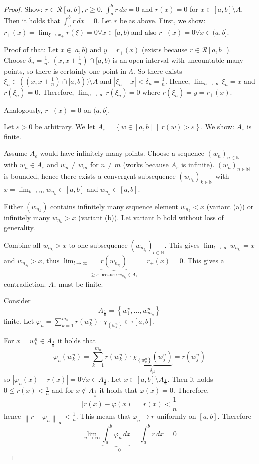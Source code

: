 \documentclass{article}
\newcommand{\set}[1]{\left\{#1\right\}}
\newcommand{\setdef}[2]{\left\{\left.#1\,\middle|\,#2\right.\right\}}
\newcommand{\norm}[1]{\left\|#1\right\|}
\newcommand{\card}[1]{\left|#1\right|}
\begin{document}
\begin{proof}
  Show: $r \in \mathcal R[a,b], r \geq 0$. $\int_a^b r \, dx = 0$
  and $r(x) = 0$ for $x \in [a,b] \setminus A$. Then it holds that $\int_a^b r \, dx = 0$.
  Let $r$ be as above. First, we show: $r_+(x) = \lim_{\xi\to x_+} r(\xi) = 0 \forall x \in [a,b)$
  and also $r_-(x) = 0 \forall x \in (a,b]$.

  Proof of that: Let $x \in [a,b)$ and $y = r_+(x)$ (exists because $r \in \mathcal R[a,b]$).
  Choose $\delta_n = \frac1n$. $(x, x + \frac1n) \cap [a,b)$ is an open interval with uncountable many points,
  so there is certainly one point in $A$. So there exists $\xi_n \in ((x, x + \frac1n) \cap [a,b)) \setminus A$
  and $\card{\xi_n - x} < \delta_n = \frac1n$.
  Hence, $\lim_{n\to\infty} \xi_n = x$ and $r(\xi_n) = 0$. Therefore, $\lim_{n\to\infty} r(\xi_n) = 0$ where $r(\xi_n) = y = r_+(x)$.

  Analogously, $r_-(x) = 0$ on $(a,b]$.

  Let $\varepsilon > 0$ be arbitrary. We let $A_{\varepsilon} = \setdef{w \in [a,b]}{r(w) > \varepsilon}$.
  We show: $A_{\varepsilon}$ is finite.

  Assume $A_{\varepsilon}$ would have infinitely many points. Choose a sequence $(w_n)_{n \in \mathbb N}$ with $w_n \in A_{\varepsilon}$ and $w_n \neq w_m$ for $n \neq m$ (works because $A_{\varepsilon}$ is infinite). $(w_n)_{n \in \mathbb N}$ is bounded, hence there exists a convergent subsequence $(w_{n_k})_{k \in \mathbb N}$ with $x = \lim_{k\to\infty} w_{n_k} \in [a,b]$ and $w_{n_k} \in [a,b]$.

  Either $(w_{n_k})$ contains infinitely many sequence element $w_{n_k} < x$ (variant (a)) or infinitely many $w_{n_k} > x$ (variant (b)). Let variant b hold without loss of generality.

  Combine all $w_{n_k} > x$ to one subsequence $(w_{n_{k_l}})_{l \in \mathbb N}$. This gives $\lim_{l\to\infty} w_{n_{k_l}} = x$ and $w_{n_{k_l}} > x$, thus $\lim_{l\to\infty} \underbrace{r(w_{n_{k_l}})}_{\geq \varepsilon \text{ because } w_{n_{k_l}} \in A_{\varepsilon}} = r_+(x) = 0$. This gives a contradiction. $A_{\varepsilon}$ must be finite.

  Consider
  \[ A_{\frac1n} = \set{w_1^n, \dots, w_{m_n}^n} \]
  finite. Let $\varphi_n = \sum_{k=1}^{m_n} r(w_k^n) \cdot \chi_{\set{w_k^n}} \in \tau[a,b]$.

  For $x = w^n_k \in A_{\frac1n}$ it holds that
  \[ \varphi_n(w_k^n) = \sum_{k=1}^{m_n} r(w_k^n) \cdot \underbrace{\chi_{\set{w_k^n}} (w_j^n)}_{\delta_{jk}} = r(w_j^n) \]
  so $\card{\varphi_n(x) - r(x)} = 0 \forall x \in A_{\frac1n}$.
  Let $x \in [a,b] \setminus A_{\frac1n}$. Then it holds $0 \leq r(x) < \frac1n$ and for $x \not\in A_{\frac1n}$ it holds that $\varphi(x) = 0$.
  Therefore,
  \[ \card{r(x) - \varphi(x)} = r(x) < \frac1n \]
  hence $\norm{r - \varphi_n}_{\infty} < \frac1n$. This means that $\varphi_n \to r$ uniformly on $[a,b]$.
  Therefore
  \[ \lim_{n\to\infty} \underbrace{\int_a^b \varphi_n \, dx}_{= 0} = \int_a^b r \, dx = 0 \]


\end{proof}
\end{document}
